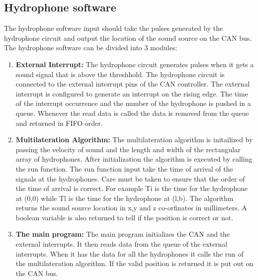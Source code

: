 
\subsection{Hydrophone software}
The hydrophone software input should take the pulses generated by the hydrophone circuit and output the location of the sound source on the CAN bus. The hydrophone software can be divided into 3 modules:
\begin{enumerate}
\item \textbf{External Interrupt:} The hydrophone circuit generates pulses when it gets a sound signal that is above the threshhold. The hydrophone circuit is connected to the external interrupt pins of the CAN controller. The external interrupt is configured to generate an interrupt on the rising edge. The time of the interrupt occurrence and the number of the hydrophone is pushed in a queue. Whenever the read data is called the data is removed from the queue and returned in FIFO order.
\item \textbf{Multilateration Algorithm:} The multilateration algorithm is initailized by passing the velocity of sound and the length and width of the rectangular array of hydrophones. After initialization the algorithm is executed by calling the run function. The run function input take the time of arrival of the signals at the hydrophones. Care must be taken to ensure that the order of the time of arrival is correct. For example Ti is the time for the hydrophone at (0,0) while Tl is the time for the hydrophone at (l,b). The algorithm returns the sound source location in x,y and z co-orfinates in millimeters. A boolean variable is also returned to tell if the position is correct or not.
\item \textbf{The main program:} The main program initializes the CAN and the external interrupts. It then reads data from the queue of the external interrupts. When it has the data for all the hydrophones it calls the run of the multilateration algorithm. If the valid position is returned it is put out on the CAN bus.
\end{enumerate}

